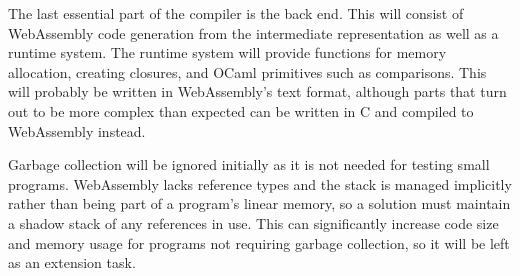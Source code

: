 \documentclass[12pt]{article}
\begin{document}



The last essential part of the compiler is the back end. This will consist of WebAssembly code generation from the intermediate representation as well as a runtime system. The runtime system will provide functions for memory allocation, creating closures, and OCaml primitives such as comparisons. This will probably be written in WebAssembly's text format, although  parts that turn out to be more complex than expected can be written in
C and compiled to WebAssembly instead.

Garbage collection will be ignored initially as it is not needed for testing small programs. WebAssembly lacks reference types and the stack is managed implicitly rather than being part of a program's linear memory, so a solution must maintain a shadow stack of any references in use. This can significantly increase code size and memory usage for programs not requiring garbage collection, so it will be left as an extension task.
\end{document}

